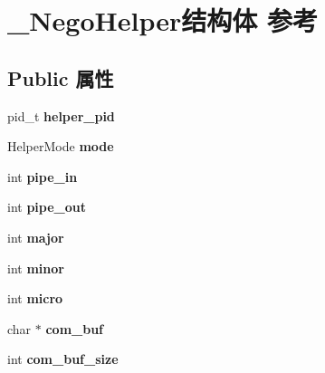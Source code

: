 \hypertarget{struct___nego_helper}{}\section{\+\_\+\+Nego\+Helper结构体 参考}
\label{struct___nego_helper}
\subsection*{Public 属性}
\begin{DoxyCompactItemize}
\item 
\mbox{\label{struct___nego_helper_a0da1dc28beeede1a9a27159e4a172197}} 
pid\+\_\+t {\bfseries helper\+\_\+pid}
\item 
\mbox{\label{struct___nego_helper_afdcc9f2c527cbb5e46c8a305c28f98b7}} 
Helper\+Mode {\bfseries mode}
\item 
\mbox{\label{struct___nego_helper_a5a056abd588deadbab54e3975db9727c}} 
int {\bfseries pipe\+\_\+in}
\item 
\mbox{\label{struct___nego_helper_a32d21a0a5f12dcfc86626e743a2a6258}} 
int {\bfseries pipe\+\_\+out}
\item 
\mbox{\label{struct___nego_helper_ab3cf0b79ee4ef3988eb6b3ec4cfb6ff9}} 
int {\bfseries major}
\item 
\mbox{\label{struct___nego_helper_a1312556b56376dcd5a53f1f72b5c90ab}} 
int {\bfseries minor}
\item 
\mbox{\label{struct___nego_helper_abdbb59771712d1687760f76f70e4b307}} 
int {\bfseries micro}
\item 
\mbox{\label{struct___nego_helper_a730d768de7d5f37ddf612947a1f44e46}} 
char $\ast$ {\bfseries com\+\_\+buf}
\item 
\mbox{\label{struct___nego_helper_a8bbe00a409ec757ecafca880cab598aa}} 
int {\bfseries com\+\_\+buf\+\_\+size}
\item 
\mbox{\label{struct___nego_helper_a27c70fa8c92d687eb72f5928929cf8d4}} 

\end{DoxyCompactItemize}
